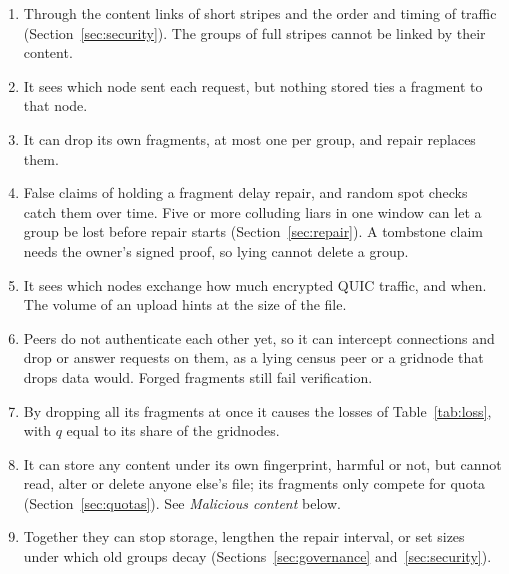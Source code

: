 \documentclass[10pt,a4paper,final]{article}
\begin{document}
{\small
\begin{enumerate}[label=\arabic*., leftmargin=*, itemsep=1pt]
	\item Through the content links of short stripes and the order and timing of traffic
	      (Section~\ref{sec:security}). The groups of full stripes cannot be linked by their content.
	\item It sees which node sent each request, but nothing stored ties a fragment to that node.
	\item It can drop its own fragments, at most one per group, and repair replaces them.
	\item False claims of holding a fragment delay repair, and random spot checks catch them over time. Five or more
	      colluding liars in one window can let a group be lost before repair starts (Section~\ref{sec:repair}). A
	      tombstone claim needs the owner's signed proof, so lying cannot delete a group.
	\item It sees which nodes exchange how much encrypted QUIC traffic, and when. The volume of an upload hints at
	      the size of the file.
	\item Peers do not authenticate each other yet, so it can intercept connections and drop or answer requests on
	      them, as a lying census peer or a gridnode that drops data would. Forged fragments still fail verification.
	\item By dropping all its fragments at once it causes the losses of Table~\ref{tab:loss}, with $q$ equal to its
	      share of the gridnodes.
	\item It can store any content under its own fingerprint, harmful or not, but cannot read, alter or delete anyone
	      else's file; its fragments only compete for quota (Section~\ref{sec:quotas}). See \emph{Malicious content}
	      below.
	\item Together they can stop storage, lengthen the repair interval, or set sizes under which old groups decay
	      (Sections~\ref{sec:governance} and~\ref{sec:security}).
\end{enumerate}
}
\end{document}
